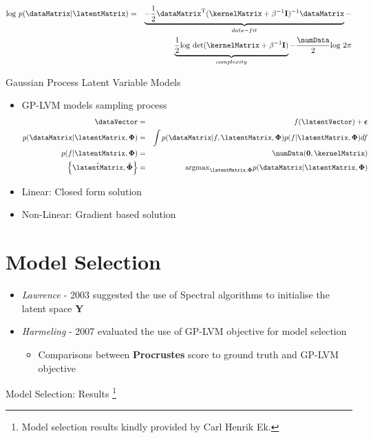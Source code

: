\begin{eqnarray*}
\mathrm{log}~p(\dataMatrix|\latentMatrix) & = & \underbrace{-\frac{1}{2}\dataMatrix^{\mathrm{T}}(\kernelMatrix+\beta^{-1}\mathbf{I})^{-1}\dataMatrix}_{data-fit}-\\
 &  & \underbrace{\frac{1}{2}\mathrm{log}~\mathrm{det}(\kernelMatrix+\beta^{-1}\mathbf{I})}_{complexity}-\frac{\numData}{2}\mathrm{log}~2\pi\end{eqnarray*}


Gaussian Process Latent Variable Models
\begin{itemize}
\item GP-LVM models sampling process \begin{eqnarray*}
\dataVector & = & f(\latentVector)+\boldsymbol{\epsilon}\\
p(\dataMatrix|\latentMatrix,\boldsymbol{\Phi}) & = & \int p(\dataMatrix|f,\latentMatrix,\boldsymbol{\Phi})p(f|\latentMatrix,\boldsymbol{\Phi})df\\
p(f|\latentMatrix,\boldsymbol{\Phi}) & = & \mathcal{\numData}(\mathbf{0},\kernelMatrix)\\
\left\{ \hat{\latentMatrix},\hat{\boldsymbol{\Phi}}\right\}  & = & \mathrm{argmax}_{\latentMatrix,\boldsymbol{\Phi}}p(\dataMatrix|\latentMatrix,\boldsymbol{\Phi})\end{eqnarray*}
 
\item Linear: Closed form solution 
\item Non-Linear: Gradient based solution 
\end{itemize}

\section{Model Selection}
\begin{itemize}
\item \emph{Lawrence} - 2003 suggested the use of Spectral algorithms to
initialise the latent space \textbf{Y} 
\item \emph{Harmeling} - 2007 evaluated the use of GP-LVM objective for
model selection 

\begin{itemize}
\item Comparisons between \textbf{Procrustes} score to ground truth and
GP-LVM objective 
\end{itemize}
\end{itemize}
Model Selection: Results%
\footnote{Model selection results kindly provided by Carl Henrik Ek.%
}

